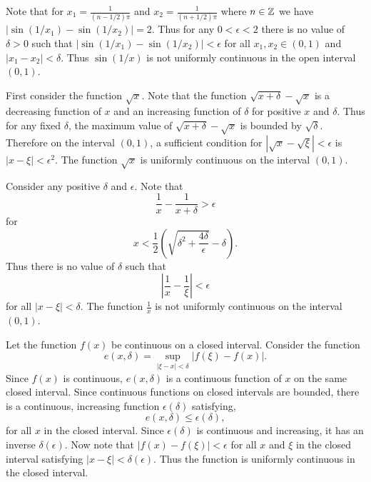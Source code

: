 \begin{Solution}
  \label{solution sin 1/x uniformly continuous}
  Note that for $x_1 = \frac{1}{(n-1/2) \pi}$ and $x_2 = \frac{1}{(n+1/2) \pi}$ 
  where $n \in \mathbb{Z}$ we have $| \sin(1/x_1) - \sin(1/x_2)| = 2$.  Thus 
  for any $0 < \epsilon < 2$ there is no value of $\delta > 0$ such that 
  $| \sin(1/x_1) - \sin(1/x_2)| < \epsilon$ for all $x_1, x_2 \in (0,1)$ and
  $|x_1 - x_2| < \delta$.  Thus $\sin(1/x)$ is not uniformly continuous
  in the open interval $(0,1)$.
\end{Solution}



\begin{Solution}
  \label{solution sqrt x uniformly continuous}
  First consider the function $\sqrt{x}$.  Note that the function
  $\sqrt{x + \delta} - \sqrt{x}$ is a decreasing function of $x$ 
  and an increasing function of $\delta$
  for positive $x$ and $\delta$.  Thus for any fixed $\delta$, the maximum 
  value of $\sqrt{x + \delta} - \sqrt{x}$ is bounded by $\sqrt{\delta}$.
  Therefore on the interval $(0,1)$, a sufficient condition for 
  $| \sqrt{x} - \sqrt{\xi} | < \epsilon$ is $| x - \xi | < \epsilon^2$.
  The function $\sqrt{x}$ is uniformly continuous on the interval $(0,1)$.

  Consider any positive $\delta$ and $\epsilon$.  
  Note that 
  \[
  \frac{1}{x} - \frac{1}{x+\delta} > \epsilon
  \]
  for
  \[
  x < \frac{1}{2} \left( \sqrt{ \delta^2 + \frac{4 \delta}{\epsilon} }
    - \delta \right).
  \]
  Thus there is no value of $\delta$ such that
  \[
  \left| \frac{1}{x} - \frac{1}{\xi} \right| < \epsilon
  \]
  for all $| x - \xi | < \delta$.  The function $\frac{1}{x}$ is not uniformly
  continuous on the interval $(0,1)$.
\end{Solution}



\begin{Solution}
  \label{solution continuous closed uniformly}
  Let the function $f(x)$ be continuous on a closed interval.
  Consider the function 
  \[
  e(x,\delta) = \sup_{|\xi-x|<\delta} | f(\xi) - f(x) |.
  \]
  Since $f(x)$ is continuous, $e(x,\delta)$ is a continuous function of
  $x$ on the same closed interval.  Since continuous functions on closed 
  intervals are bounded, there is a continuous, increasing function 
  $\epsilon(\delta)$ satisfying,
  \[
  e(x,\delta) \leq \epsilon(\delta),
  \]
  for all $x$ in the closed interval.  Since $\epsilon(\delta)$ is 
  continuous and increasing, it has an inverse $\delta(\epsilon)$.
  Now note that $|f(x) - f(\xi)| < \epsilon$ for all $x$ and $\xi$ in the
  closed interval satisfying $|x - \xi| < \delta(\epsilon)$.  Thus 
  the function is uniformly continuous in the closed interval.
\end{Solution}










